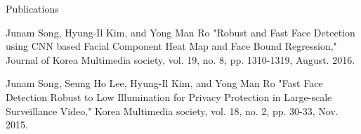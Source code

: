\documentclass{resume}
\begin{document}
\begin{rSection}{Publications}
  \item Junam Song, Hyung-Il Kim, and Yong Man Ro "Robust and Fast Face Detection using CNN based Facial Component Heat Map and Face Bound Regression," Journal of Korea Multimedia society, vol. 19, no. 8, pp. 1310-1319, August. 2016.
  
 \item Junam Song, Seung Ho Lee, Hyung-Il Kim, and Yong Man Ro "Fast Face Detection Robust to Low Illumination for Privacy Protection in Large-scale Surveillance Video," Korea Multimedia society, vol. 18, no. 2, pp. 30-33, Nov. 2015.
\end{rSection}
\end{document}
